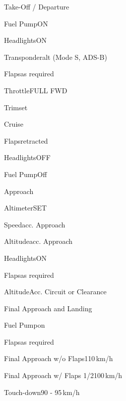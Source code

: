 \begin{checklist}{Take-Off / Departure}
	  \item{Fuel Pump}{ON}
	  \item{Headlights}{ON}
	  \item{Transponder}{alt (Mode S, ADS-B)}
	  \item{Flaps}{as required}
	\vspace{2mm}
	  \item{Throttle}{FULL FWD}
	\item{Trim}{set}
\end{checklist}
	
\begin{checklist}{Cruise}
	\item{Flaps}{retracted}
	\item{Headlights}{OFF}
	\item{Fuel Pump}{Off} 
	 
\end{checklist}

\begin{checklist}{Approach}
	\item{Altimeter}{SET}
	\item{Speed}{acc. Approach}
	\item{Altitude}{acc. Approach}
	\item{Headlights}{ON}
	\item{Flaps}{as required}
	\item{Altitude}{Acc. Circuit or Clearance}
\end{checklist}

\begin{checklist}{Final Approach and Landing}
	\item{Fuel Pump}{on}
	\item{Flaps}{as required}
	\item{Final Approach w/o Flaps}{110\,km/h}
	\item{Final Approach w/ Flaps 1/2}{100\,km/h}
	\item{Touch-down}{90 - 95\,km/h}
\end{checklist}

